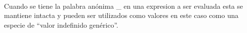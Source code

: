       \begin{fxcode}
         \\
      \end{fxcode}
      
      Cuando se tiene la palabra anónima \_ en una expresion a ser evaluada esta se mantiene intacta y pueden ser utilizados como valores en este caso como una especie de ``valor indefinido genérico''.
   
      \begin{fxcode}
         \arrowcode{\_}\\
         \outcode{\_}
      \end{fxcode}
   
   
   
   
   
   
   
   